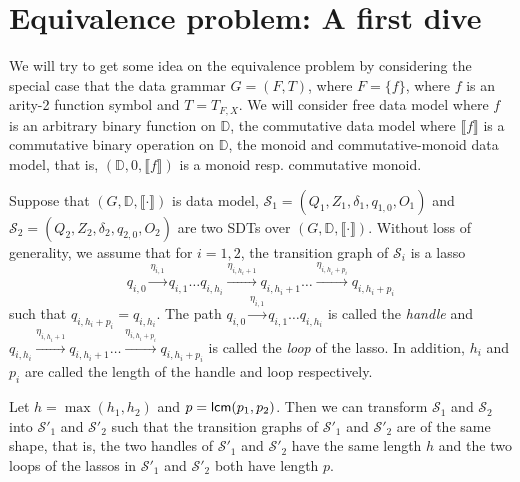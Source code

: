 \documentclass[runningheads,a4paper]{llncs}
\newcommand\dd{\mathbb{D}}
\newcommand\Ss{\mathcal{S}}
\begin{document}
\section{Equivalence problem: A first dive}

We will try to get some idea on the equivalence problem by considering the special case that the data grammar $G=(F,T)$, where $F=\{f\}$, where $f$ is an arity-2 function symbol and $T = T_{F,X}$. We will consider free data model where $f$ is an arbitrary binary function on $\dd$, the commutative data model where $\llbracket f \rrbracket$ is a commutative binary operation on $\dd$, the monoid and commutative-monoid data model, that is, $(\dd, 0, \llbracket f \rrbracket)$ is a monoid resp. commutative monoid.

Suppose that $(G, \dd, \llbracket \cdot \rrbracket)$ is data model, $\Ss_1 = (Q_1, Z_1, \delta_1, q_{1,0}, O_1)$ and $\Ss_2 = (Q_2, Z_2, \delta_2, q_{2,0}, O_2)$ are two SDTs over $(G, \dd, \llbracket \cdot \rrbracket)$. Without loss of generality, we assume that for $i=1,2$, the transition graph of $\Ss_i$ is a lasso 
$$q_{i,0} \xrightarrow{\eta_{i,1}} q_{i, 1}  \dots q_{i, h_i} \xrightarrow{\eta_{i, h_i+1}} q_{i, h_i+1} \dots \xrightarrow{\eta_{i, h_i+p_i}} q_{i, h_i+p_i}$$ 
such that $q_{i, h_i+p_i}= q_{i, h_i}$. The path $q_{i,0} \xrightarrow{\eta_{i,1}} q_{i, 1}  \dots q_{i, h_i}$ is called the \emph{handle} and $q_{i, h_i} \xrightarrow{\eta_{i, h_i+1}} q_{i, h_i+1} \dots \xrightarrow{\eta_{i, h_i+p_i}} q_{i, h_i+p_i}$ is called the \emph{loop} of the lasso. In addition, $h_i$ and $p_i$ are called the length of the handle and loop respectively.

Let $h=\max(h_1,h_2)$ and $p = {\sf lcm}(p_1, p_2)$. Then we can transform $\Ss_1$ and $\Ss_2$ into $\Ss'_1$ and $\Ss'_2$ such that the transition graphs of $\Ss'_1$ and $\Ss'_2$ are of the same shape, that is, the two handles of $\Ss'_1$ and $\Ss'_2$ have the same length $h$ and the two loops of the lassos in $\Ss'_1$ and $\Ss'_2$ both have length $p$.
\end{document}
